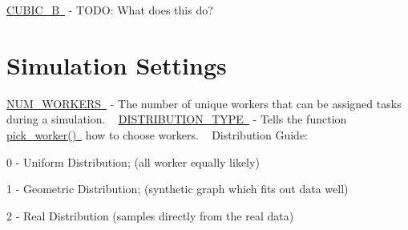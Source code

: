 \mbox{\hyperlink{namespacedynamicfilterapp_1_1toggles_a2d4f2e30d34616c754114da7b5c88000}{C\+U\+B\+I\+C\+\_\+B }} -\/ T\+O\+DO\+: What does this do? ~\newline
 \hypertarget{toggles_sim}{}\section{Simulation Settings}\label{toggles_sim}
\mbox{\hyperlink{namespacedynamicfilterapp_1_1toggles_a806fc12166c09fa5baabfcbe218040ae}{N\+U\+M\+\_\+\+W\+O\+R\+K\+E\+RS }} -\/ The number of unique workers that can be assigned tasks during a simulation. ~\newline
 \mbox{\hyperlink{namespacedynamicfilterapp_1_1toggles_aceed21fa0675802d2f756c7da43cb049}{D\+I\+S\+T\+R\+I\+B\+U\+T\+I\+O\+N\+\_\+\+T\+Y\+PE }} -\/ Tells the function \mbox{\hyperlink{}{pick\+\_\+worker() }} how to choose workers. ~\newline
Distribution Guide\+:
\begin{DoxyItemize}
\item 0 -\/ Uniform Distribution; (all worker equally likely)
\item 1 -\/ Geometric Distribution; (synthetic graph which fits out data well)
\item 2 -\/ Real Distribution (samples directly from the real data)
\end{DoxyItemize}

